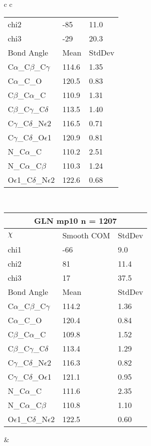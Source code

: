 \begin{longtable}{ c c }
\begin{tabular}{ l l l }
  chi2 & -85 & 11.0 \\ 
  chi3 & -29 & 20.3 \\ \midrule
  Bond Angle   & Mean     & StdDev \\ \midrule
  C$\alpha$\_C$\beta$\_C$\gamma$ & 114.6 & 1.35\\
  C$\alpha$\_C\_O & 120.5 & 0.83\\
  C$\beta$\_C$\alpha$\_C & 110.9 & 1.31\\
  C$\beta$\_C$\gamma$\_C$\delta$ & 113.5 & 1.40\\
  C$\gamma$\_C$\delta$\_N$\epsilon$2 & 116.5 & 0.71\\
  C$\gamma$\_C$\delta$\_O$\epsilon$1 & 120.9 & 0.81\\
  N\_C$\alpha$\_C & 110.2 & 2.51\\
  N\_C$\alpha$\_C$\beta$ & 110.3 & 1.24\\
  O$\epsilon$1\_C$\delta$\_N$\epsilon$2 & 122.6 & 0.68\\
  \bottomrule
  \end{tabular}
  \\
  \begin{tabular}{ l l l }
  \toprule
  \multicolumn{3}{c}{GLN \textbf{mp10} n = 1207} \\ \toprule
  $\chi$       & Smooth COM & StdDev \\ \midrule
  chi1 & -66 & 9.0 \\ 
  chi2 & 81 & 11.4 \\ 
  chi3 & 17 & 37.5 \\ \midrule
  Bond Angle   & Mean     & StdDev \\ \midrule
  C$\alpha$\_C$\beta$\_C$\gamma$ & 114.2 & 1.36\\
  C$\alpha$\_C\_O & 120.4 & 0.84\\
  C$\beta$\_C$\alpha$\_C & 109.8 & 1.52\\
  C$\beta$\_C$\gamma$\_C$\delta$ & 113.4 & 1.29\\
  C$\gamma$\_C$\delta$\_N$\epsilon$2 & 116.3 & 0.82\\
  C$\gamma$\_C$\delta$\_O$\epsilon$1 & 121.1 & 0.95\\
  N\_C$\alpha$\_C & 111.6 & 2.35\\
  N\_C$\alpha$\_C$\beta$ & 110.8 & 1.10\\
  O$\epsilon$1\_C$\delta$\_N$\epsilon$2 & 122.5 & 0.60\\
  \bottomrule
  \end{tabular}
  &
  \begin{tabular}{ l l l }
  \toprule

\end{tabular}
\end{longtable}
